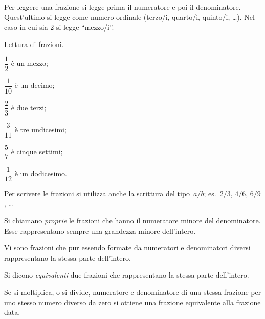 Per leggere una frazione si legge prima il numeratore e poi il denominatore.
Quest'ultimo si legge come numero ordinale (terzo/i, quarto/i, quinto/i, \ldots).
Nel caso in cui sia 2 si legge ``mezzo/i''.

\begin{exrig}
\begin{esempio}
 Lettura di frazioni.
 \begin{multicols}{3}
 \begin{enumeratea}
\item $\dfrac{1}{2}$ è un mezzo;
\item $\dfrac{1}{10}$ è un decimo;
\item $\dfrac{2}{3}$ è due terzi;
\item $\dfrac{3}{11}$ è tre undicesimi;
\item $\dfrac{5}{7}$ è cinque settimi;
\item $\dfrac{1}{12}$ è un dodicesimo.
\end{enumeratea}
\end{multicols}
\end{esempio}
\end{exrig}

Per scrivere le frazioni si utilizza anche la scrittura del tipo~$a/b$; es.~$2/3$, $4/6$, $6/9$, \ldots

\begin{definizione}
Si chiamano \emph{proprie} le frazioni che hanno il numeratore minore del denominatore.
Esse rappresentano sempre una grandezza minore dell'intero.
\end{definizione}

\pagebreak

Vi sono frazioni che pur essendo formate da numeratori e denominatori diversi rappresentano
la stessa parte dell'intero.
\begin{center}
 
\end{center}
 \ovalbox{\risolvii \ref{ese:3.1}, \ref{ese:3.2}, \ref{ese:3.3}, \ref{ese:3.4}}

\begin{definizione}
Si dicono \emph{equivalenti} due frazioni che rappresentano la stessa parte dell'intero.
\end{definizione}

\begin{proprieta}
Se si moltiplica, o si divide, numeratore e denominatore di una stessa frazione per uno stesso numero diverso da zero
si ottiene una frazione equivalente alla frazione data.
\end{proprieta}

